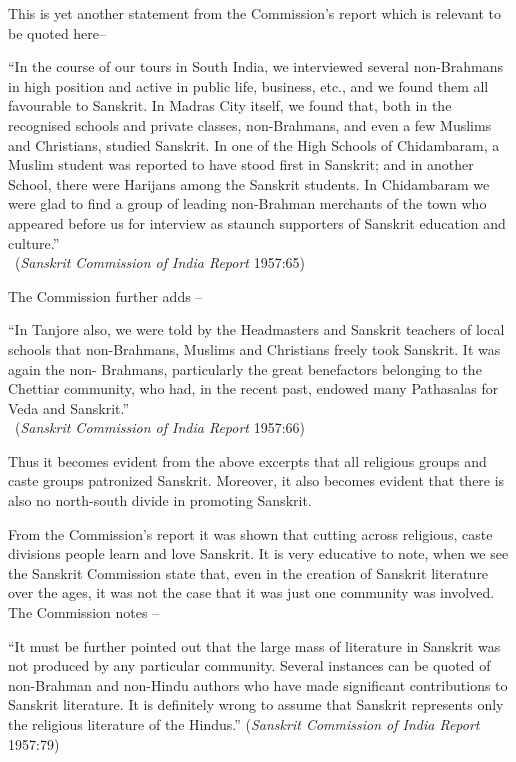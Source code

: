 This is yet another statement from the Commission’s report which is relevant to be quoted here–
\begin{myquote}
\eleven
“In the course of our tours in South India, we interviewed several non-Brahmans in high position and active in public life, business, etc., and we found them all favourable to Sanskrit. In Madras City itself, we found that, both in the recognised schools and private classes, non-Brahmans, and even a few Muslims and Christians, studied Sanskrit. In one of the High Schools of Chidambaram, a Muslim student was reported to have stood first in Sanskrit; and in another School, there were Harijans among the Sanskrit students. In Chidambaram we were glad to find a group of leading non-Brahman merchants of the town who appeared before us for interview as staunch supporters of Sanskrit education and culture.”\\[-15pt] 

~\hfill({\sl Sanskrit Commission of India Report} 1957:65)
\end{myquote}

The Commission further adds –
\begin{myquote}
\eleven
“In Tanjore also, we were told by the Headmasters and Sanskrit teachers of local schools that non-Brahmans, Muslims and Christians freely took Sanskrit. It was again the non- Brahmans, particularly the great benefactors belonging to the Chettiar community, who had, in the recent past, endowed many Pathasalas for Veda and Sanskrit.”\\[-15pt] 

~\hfill ({\sl Sanskrit Commission of India Report} 1957:66)
\end{myquote}

Thus it becomes evident from the above excerpts that all religious groups and caste groups patronized Sanskrit.  Moreover, it also becomes evident that there is also no north-south divide in promoting Sanskrit. 

From the Commission’s report it was shown that cutting across religious, caste divisions people learn and love Sanskrit. It is very educative to note, when we see the Sanskrit Commission state that, even in the creation of Sanskrit literature over the ages, it was not the case that it was just one community was involved. The Commission notes –
\begin{myquote}
\eleven
“It must be further pointed out that the large mass of literature in Sanskrit was not produced by any particular community. Several instances can be quoted of non-Brahman and non-Hindu authors who have made significant contributions to Sanskrit literature. It is definitely wrong to assume that Sanskrit represents only the religious literature of the Hindus.”  \hfill ({\sl Sanskrit Commission of India Report} 1957:79)
\end{myquote}


